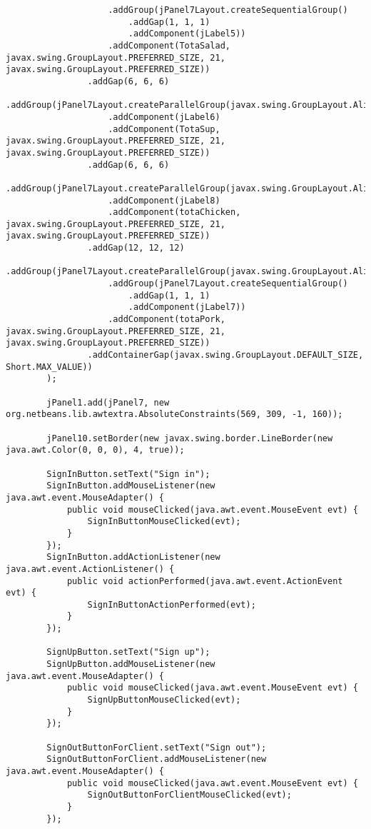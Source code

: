 \documentclass[12pt,a4paper]{article}
\begin{document}
\begin{lstlisting}
                    .addGroup(jPanel7Layout.createSequentialGroup()
                        .addGap(1, 1, 1)
                        .addComponent(jLabel5))
                    .addComponent(TotaSalad, javax.swing.GroupLayout.PREFERRED_SIZE, 21, javax.swing.GroupLayout.PREFERRED_SIZE))
                .addGap(6, 6, 6)
                .addGroup(jPanel7Layout.createParallelGroup(javax.swing.GroupLayout.Alignment.LEADING)
                    .addComponent(jLabel6)
                    .addComponent(TotaSup, javax.swing.GroupLayout.PREFERRED_SIZE, 21, javax.swing.GroupLayout.PREFERRED_SIZE))
                .addGap(6, 6, 6)
                .addGroup(jPanel7Layout.createParallelGroup(javax.swing.GroupLayout.Alignment.LEADING)
                    .addComponent(jLabel8)
                    .addComponent(totaChicken, javax.swing.GroupLayout.PREFERRED_SIZE, 21, javax.swing.GroupLayout.PREFERRED_SIZE))
                .addGap(12, 12, 12)
                .addGroup(jPanel7Layout.createParallelGroup(javax.swing.GroupLayout.Alignment.LEADING)
                    .addGroup(jPanel7Layout.createSequentialGroup()
                        .addGap(1, 1, 1)
                        .addComponent(jLabel7))
                    .addComponent(totaPork, javax.swing.GroupLayout.PREFERRED_SIZE, 21, javax.swing.GroupLayout.PREFERRED_SIZE))
                .addContainerGap(javax.swing.GroupLayout.DEFAULT_SIZE, Short.MAX_VALUE))
        );

        jPanel1.add(jPanel7, new org.netbeans.lib.awtextra.AbsoluteConstraints(569, 309, -1, 160));

        jPanel10.setBorder(new javax.swing.border.LineBorder(new java.awt.Color(0, 0, 0), 4, true));

        SignInButton.setText("Sign in");
        SignInButton.addMouseListener(new java.awt.event.MouseAdapter() {
            public void mouseClicked(java.awt.event.MouseEvent evt) {
                SignInButtonMouseClicked(evt);
            }
        });
        SignInButton.addActionListener(new java.awt.event.ActionListener() {
            public void actionPerformed(java.awt.event.ActionEvent evt) {
                SignInButtonActionPerformed(evt);
            }
        });

        SignUpButton.setText("Sign up");
        SignUpButton.addMouseListener(new java.awt.event.MouseAdapter() {
            public void mouseClicked(java.awt.event.MouseEvent evt) {
                SignUpButtonMouseClicked(evt);
            }
        });

        SignOutButtonForClient.setText("Sign out");
        SignOutButtonForClient.addMouseListener(new java.awt.event.MouseAdapter() {
            public void mouseClicked(java.awt.event.MouseEvent evt) {
                SignOutButtonForClientMouseClicked(evt);
            }
        });


\end{lstlisting}
\end{document}
